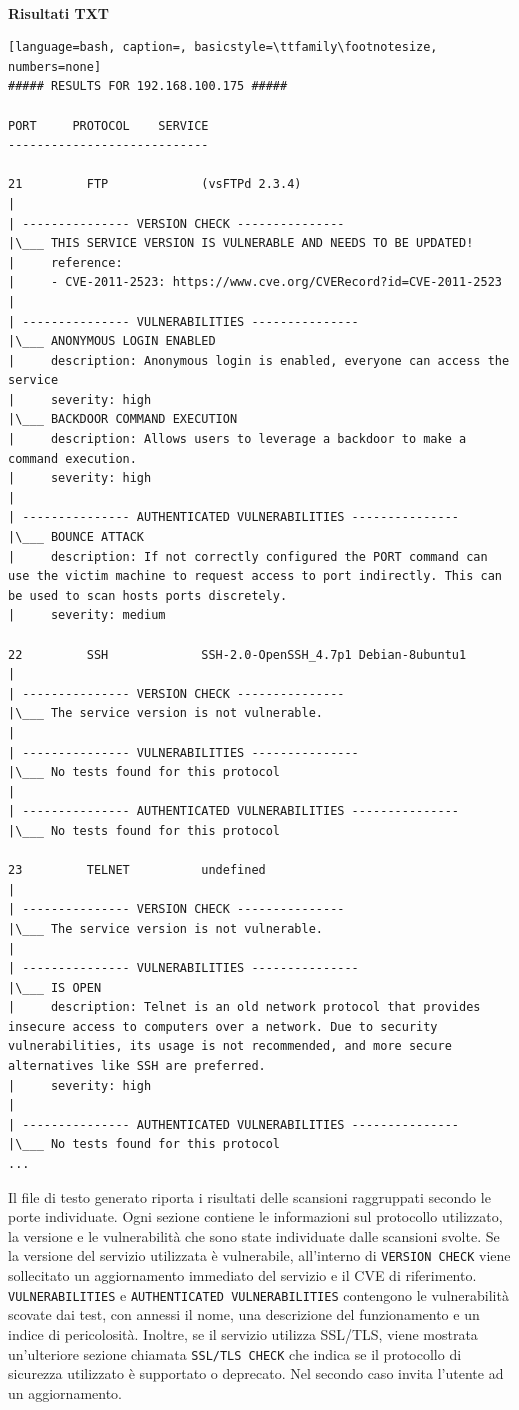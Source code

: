 \documentclass[12pt]{report}
\begin{document}
\noindent
\\
\textbf{Risultati TXT}
\begin{lstlisting}[language=bash, caption=, basicstyle=\ttfamily\footnotesize, numbers=none]
##### RESULTS FOR 192.168.100.175 #####

PORT 	 PROTOCOL 	 SERVICE
----------------------------

21         FTP             (vsFTPd 2.3.4)             
|
| --------------- VERSION CHECK ---------------
|\___ THIS SERVICE VERSION IS VULNERABLE AND NEEDS TO BE UPDATED!
|     reference:
|     - CVE-2011-2523: https://www.cve.org/CVERecord?id=CVE-2011-2523
|
| --------------- VULNERABILITIES ---------------
|\___ ANONYMOUS LOGIN ENABLED
|     description: Anonymous login is enabled, everyone can access the service
|     severity: high
|\___ BACKDOOR COMMAND EXECUTION
|     description: Allows users to leverage a backdoor to make a command execution.
|     severity: high
|
| --------------- AUTHENTICATED VULNERABILITIES ---------------
|\___ BOUNCE ATTACK
|     description: If not correctly configured the PORT command can use the victim machine to request access to port indirectly. This can be used to scan hosts ports discretely.
|     severity: medium

22         SSH             SSH-2.0-OpenSSH_4.7p1 Debian-8ubuntu1              
|
| --------------- VERSION CHECK ---------------
|\___ The service version is not vulnerable.
|
| --------------- VULNERABILITIES ---------------
|\___ No tests found for this protocol
|
| --------------- AUTHENTICATED VULNERABILITIES ---------------
|\___ No tests found for this protocol

23         TELNET          undefined              
|
| --------------- VERSION CHECK ---------------
|\___ The service version is not vulnerable.
|
| --------------- VULNERABILITIES ---------------
|\___ IS OPEN
|     description: Telnet is an old network protocol that provides insecure access to computers over a network. Due to security vulnerabilities, its usage is not recommended, and more secure alternatives like SSH are preferred.
|     severity: high
|
| --------------- AUTHENTICATED VULNERABILITIES ---------------
|\___ No tests found for this protocol
...
\end{lstlisting}
Il file di testo generato riporta i risultati delle scansioni raggruppati secondo le porte individuate. Ogni sezione contiene le informazioni sul protocollo utilizzato, la versione e le vulnerabilità che sono state individuate dalle scansioni svolte. Se la versione del servizio utilizzata è vulnerabile, all'interno di \lstinline{VERSION CHECK} viene sollecitato un aggiornamento immediato del servizio e il CVE di riferimento. \lstinline{VULNERABILITIES} e \lstinline{AUTHENTICATED VULNERABILITIES} contengono le vulnerabilità scovate dai test, con annessi il nome, una descrizione del funzionamento e un indice di pericolosità. Inoltre, se il servizio utilizza SSL/TLS, viene mostrata un'ulteriore sezione chiamata \lstinline{SSL/TLS CHECK} che indica se il protocollo di sicurezza utilizzato è supportato o deprecato. Nel secondo caso invita l'utente ad un aggiornamento.
\end{document}
